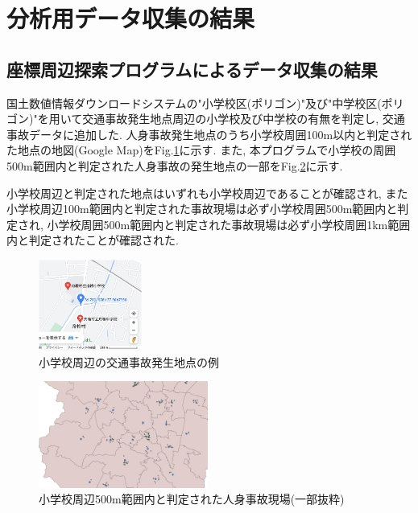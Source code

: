 \documentclass[a4j,8.5pt, twocolumn,fleqn]{jbook}
\begin{document}
\section{分析用データ収集の結果}
\subsection{座標周辺探索プログラムによるデータ収集の結果}
国土数値情報ダウンロードシステムの"小学校区(ポリゴン)"及び"中学校区(ポリゴン)"を用いて交通事故発生地点周辺の小学校及び中学校の有無を判定し, 交通事故データに追加した. 
人身事故発生地点のうち小学校周囲100m以内と判定された地点の地図(Google Map)をFig.\ref{shougakkou_gmap}に示す. 
また, 本プログラムで小学校の周囲500m範囲内と判定された人身事故の発生地点の一部をFig.\ref{shougaku500}に示す. 

小学校周辺と判定された地点はいずれも小学校周辺であることが確認され, また小学校周辺100m範囲内と判定された事故現場は必ず小学校周囲500m範囲内と判定され, 小学校周囲500m範囲内と判定された事故現場は必ず小学校周囲1km範囲内と判定されたことが確認された. 

\begin{figure}[htb]
    \centering
    \includegraphics[height=30mm]{images/shougakkou_gmap.png}
    \vspace{-3mm}
    \caption{小学校周辺の交通事故発生地点の例}
    \label{shougakkou_gmap}
\end{figure}

\begin{figure}[htb]
    \centering
    \includegraphics[height=35mm]{images/shougaku500.png}
    \vspace{-3mm}
    \caption{小学校周辺500m範囲内と判定された人身事故現場(一部抜粋)}
    \label{shougaku500}
\end{figure}
\end{document}

